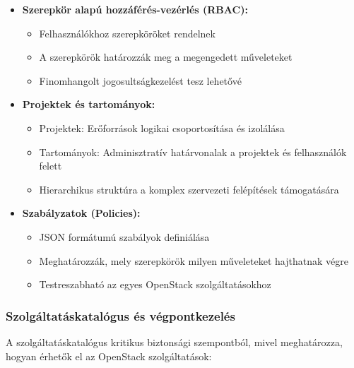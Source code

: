 \documentclass[a4paper,12pt]{article}
\begin{document}
    \begin{itemize}
        \item \textbf{Szerepkör alapú hozzáférés-vezérlés (RBAC):}
        \begin{itemize}
            \item Felhasználókhoz szerepköröket rendelnek
            \item A szerepkörök határozzák meg a megengedett műveleteket
            \item Finomhangolt jogosultságkezelést tesz lehetővé
        \end{itemize}

        \item \textbf{Projektek és tartományok:}
        \begin{itemize}
            \item Projektek: Erőforrások logikai csoportosítása és izolálása
            \item Tartományok: Adminisztratív határvonalak a projektek és felhasználók felett
            \item Hierarchikus struktúra a komplex szervezeti felépítések támogatására
        \end{itemize}

        \item \textbf{Szabályzatok (Policies):}
        \begin{itemize}
            \item JSON formátumú szabályok definiálása
            \item Meghatározzák, mely szerepkörök milyen műveleteket hajthatnak végre
            \item Testreszabható az egyes OpenStack szolgáltatásokhoz
        \end{itemize}
    \end{itemize}

    \subsubsection{Szolgáltatáskatalógus és végpontkezelés}

    A szolgáltatáskatalógus kritikus biztonsági szempontból, mivel meghatározza, hogyan érhetők el az OpenStack szolgáltatások:
\end{document}
